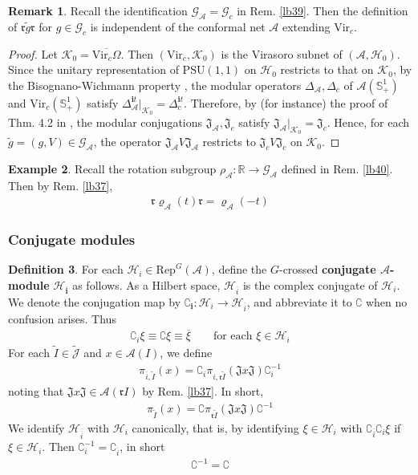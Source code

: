 \documentclass[11pt,b5paper,notitlepage]{article}
\theoremstyle{definition}
\newtheorem{df}{Definition}[section]
\newtheorem{eg}[df]{Example}
\newtheorem{rem}[df]{Remark}
\theoremstyle{plain}
\newcommand{\fk}{\mathfrak}
\newcommand{\wtd}{\widetilde}
\newcommand{\ovl}{\overline}
\newcommand{\RepGA}{\mathrm{Rep}^G(\mathcal A)}
\newcommand{\PSU}{\mathrm{PSU}(1,1)}
\newcommand{\Vir}{\mathrm{Vir}}
\newcommand{\GA}{\mathscr G_{\mathcal A}}
\newcommand{\Jtd}{\widetilde{\mathcal J}}
\newcommand{\im}{\mathbf{i}}
\newcommand{\Co}{\complement}
\newcommand{\Rbb}{\mathbb R}
\newcommand{\Sbb}{{\mathbb S}}
\newcommand{\Gc}{\mathscr G_c}
\newcommand{\rk}{\mathfrak r}
\newcommand{\MA}{\mathcal A}
\newcommand{\MH}{\mathcal H}
\newcommand{\MK}{\mathcal K}
\numberwithin{equation}{section}
\begin{document}
\begin{rem}
Recall the identification $\GA=\Gc$ in Rem. \ref{lb39}. Then the definition of $\rk \wtd g\rk$ for $g\in\Gc$ is independent of the conformal net $\MA$ extending $\Vir_c$.
\end{rem}


\begin{proof}
Let $\MK_0=\ovl{\Vir_c\Omega}$. Then $(\Vir_c,\MK_0)$ is the Virasoro subnet of $(\MA,\MH_0)$. Since the unitary representation of $\PSU$ on $\MH_0$ restricts to that on $\MK_0$, by the Bisognano-Wichmann property \cite[Thm. 2.19]{GF93}, the modular operators $\Delta_\MA,\Delta_c$ of $\MA(\Sbb^1_+)$ and $\Vir_c(\Sbb^1_+)$ satisfy $\Delta_\MA^{\im t}|_{\MK_0}=\Delta_c^{\im t}$. Therefore, by (for instance) the proof of Thm. 4.2 in \cite[Sec. IX.4]{Tak03}, the modular conjugations $\fk J_{\MA},\fk J_c$ satisfy $\fk J_\MA|_{\MK_0}=\fk J_c$. Hence, for each $\wtd g=(g,V)\in\GA$, the operator $\fk J_\MA V\fk J_\MA$ restricts to $\fk J_c V\fk J_c$ on $\MK_0$.
\end{proof}


\begin{eg}\label{lb41}
Recall the rotation subgroup $\rho_\MA:\Rbb\rightarrow\GA$ defined in Rem. \ref{lb40}. Then by Rem. \ref{lb37},
\begin{align*}
\rk\varrho_\MA(t)\rk=\varrho_\MA(-t)
\end{align*}
\end{eg}







\subsubsection{Conjugate modules}\label{lb143}

\begin{df}\label{lb46}
For each $\MH_i\in\RepGA$, define the $G$-crossed \textbf{conjugate $\MA$-module} $\pmb{\MH_{\ovl i}}$ as follows. As a Hilbert space, $\MH_{\ovl i}$ is the complex conjugate of $\MH_i$. We denote the conjugation map by $\pmb{\Co_i}:\MH_i\rightarrow\MH_{\ovl i}$, and abbreviate it to $\pmb\Co$ when no confusion arises. Thus
\begin{align*}
\Co_i\xi\equiv\Co\xi\equiv\ovl \xi\qquad\text{for each }\xi\in\MH_i
\end{align*}
For each $\wtd I\in\Jtd$ and $x\in\MA(I)$, we define
\begin{align*}
\pi_{\ovl i,\wtd I}(x)=\Co_i\pi_{i,\rk\wtd I}(\fk Jx\fk J)\Co_i^{-1}
\end{align*}
noting that $\fk Jx\fk J\in\MA(\rk I)$ by Rem. \ref{lb37}. In short,
\begin{align}\label{eq19}
\pi_{\wtd I}(x)=\Co\pi_{\rk\wtd I}(\fk Jx\fk J)\Co^{-1}
\end{align}
We identify $\MH_{\ovl{\ovl i}}$ with $\MH_i$ canonically, that is, by identifying $\xi\in\MH_i$ with $\Co_{\ovl i}\Co_i\xi$ if $\xi\in\MH_i$. Then $\Co_i^{-1}=\Co_{\ovl i}$, in short
\begin{align*}
\Co^{-1}=\Co
\end{align*}
\end{df}
\end{document}

